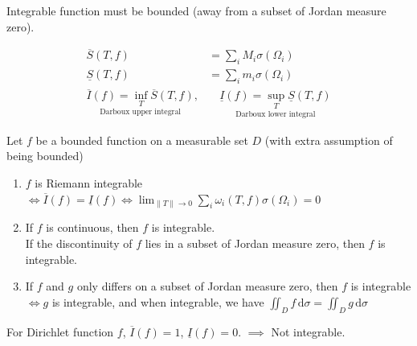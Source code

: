 \begin{theorem}
    Integrable function must be bounded (away from a subset of Jordan measure zero).
\end{theorem}

\begin{align*}
    \overline{S}(T,f)                                                                                            & =\sum_iM_i\sigma(\Omega_i) \\
    \underline{S}(T,f)                                                                                           & =\sum_im_i\sigma(\Omega_i) \\
    \underset{\text{Darboux upper integral}}{\overline{I}(f)=\underset{T}{\operatorname{inf}}\overline{S}(T,f)}, & \quad
    \underset{\text{Darboux lower integral}}{\underline{I}(f)=\underset{T}{\operatorname{sup}}\underline{S}(T,f)}
\end{align*}

\begin{theorem}
    Let $f$ be a bounded function on a measurable set $D$ (with extra assumption of being bounded)
    \begin{enumerate}
        \item $f$ is Riemann integrable $\iff\overline{I}(f)=\underline{I}(f)\iff\displaystyle\lim_{\|T\|\to 0}\sum_i\omega_i(T,f)\sigma(\Omega_i)=0$
        \item If $f$ is continuous, then $f$ is integrable.\\
              If the discontinuity of $f$ lies in a subset of Jordan measure zero, then $f$ is integrable.
        \item If $f$ and $g$ only differs on a subset of Jordan measure zero, then $f$ is integrable $\iff g$ is integrable, and when integrable, we have $\iint_Df\,\mathrm{d}\sigma=\iint_Dg\,\mathrm{d}\sigma$
    \end{enumerate}
\end{theorem}

\begin{example}
    For Dirichlet function $f$, $\overline{I}(f)=1$, $\underline{I}(f)=0$. $\implies$ Not integrable.
\end{example}

